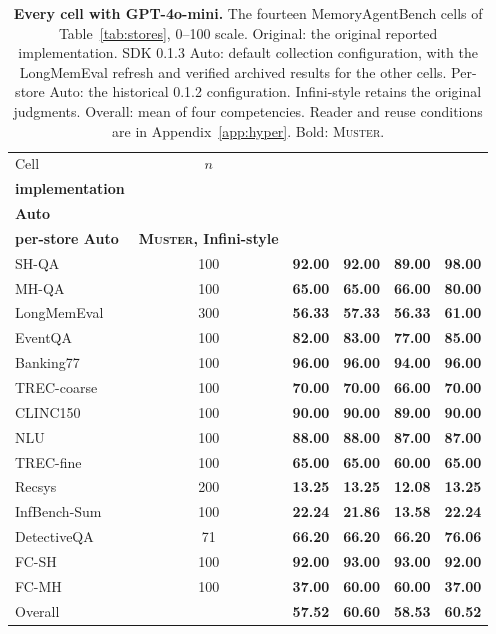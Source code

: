 \documentclass{article}
\newcommand{\tabfont}{\fontsize{7.5}{8.5}\selectfont\renewcommand{\arraystretch}{1.0}}
\newcommand{\sys}{\textsc{Muster}}
\begin{document}
\begin{table}[!htbp]
\centering\tabfont
\caption{\textbf{Every cell with GPT-4o-mini.} The fourteen MemoryAgentBench cells of Table~\ref{tab:stores}, 0--100 scale. Original: the original reported implementation. SDK 0.1.3 Auto: default collection configuration, with the LongMemEval refresh and verified archived results for the other cells. Per-store Auto: the historical 0.1.2 configuration. Infini-style retains the original judgments. Overall: mean of four competencies. Reader and reuse conditions are in Appendix~\ref{app:hyper}. Bold: \sys{}.}
\label{tab:expanded4o-mini}
\setlength{\tabcolsep}{4pt}\setlength{\aboverulesep}{0pt}\setlength{\belowrulesep}{0pt}\setlength{\extrarowheight}{0.8pt}
\begin{tabular}{lc>{\columncolor{oursbg}}c>{\columncolor{oursbg}}c>{\columncolor{oursbg}}c>{\columncolor{oursbg}}c}
\toprule
Cell & $n$ & \shortstack{\textbf{Original}\\\textbf{implementation}} & \shortstack{\textbf{SDK 0.1.3}\\\textbf{Auto}} & \shortstack{\textbf{0.1.2}\\\textbf{per-store Auto}} & \textbf{\sys{}, Infini-style} \\
\midrule
SH-QA & 100 & \textbf{92.00} & \textbf{92.00} & \textbf{89.00} & \textbf{98.00} \\
MH-QA & 100 & \textbf{65.00} & \textbf{65.00} & \textbf{66.00} & \textbf{80.00} \\
LongMemEval & 300 & \textbf{56.33} & \textbf{57.33} & \textbf{56.33} & \textbf{61.00} \\
EventQA & 100 & \textbf{82.00} & \textbf{83.00} & \textbf{77.00} & \textbf{85.00} \\
Banking77 & 100 & \textbf{96.00} & \textbf{96.00} & \textbf{94.00} & \textbf{96.00} \\
TREC-coarse & 100 & \textbf{70.00} & \textbf{70.00} & \textbf{66.00} & \textbf{70.00} \\
CLINC150 & 100 & \textbf{90.00} & \textbf{90.00} & \textbf{89.00} & \textbf{90.00} \\
NLU & 100 & \textbf{88.00} & \textbf{88.00} & \textbf{87.00} & \textbf{87.00} \\
TREC-fine & 100 & \textbf{65.00} & \textbf{65.00} & \textbf{60.00} & \textbf{65.00} \\
Recsys & 200 & \textbf{13.25} & \textbf{13.25} & \textbf{12.08} & \textbf{13.25} \\
InfBench-Sum & 100 & \textbf{22.24} & \textbf{21.86} & \textbf{13.58} & \textbf{22.24} \\
DetectiveQA & 71 & \textbf{66.20} & \textbf{66.20} & \textbf{66.20} & \textbf{76.06} \\
FC-SH & 100 & \textbf{92.00} & \textbf{93.00} & \textbf{93.00} & \textbf{92.00} \\
FC-MH & 100 & \textbf{37.00} & \textbf{60.00} & \textbf{60.00} & \textbf{37.00} \\
\midrule
Overall &  & \textbf{57.52} & \textbf{60.60} & \textbf{58.53} & \textbf{60.52} \\
\bottomrule
\end{tabular}
\end{table}
\end{document}
